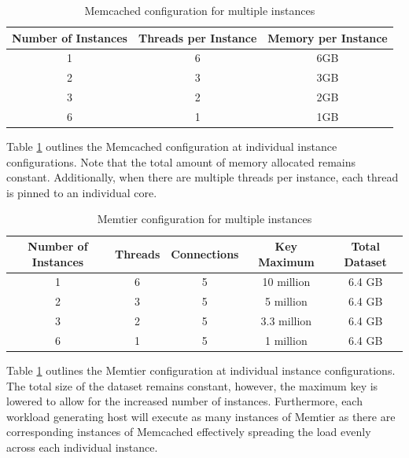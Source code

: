 \begin{table}[h!]
\centering
\begin{tabular}{| c c c |}
 \hline
 Number of Instances & Threads per Instance & Memory per Instance \\ [0.5ex]
 \hline\hline

 1 & 6 & 6GB \\
 2 & 3 & 3GB \\
 3 & 2 & 2GB \\
 6 & 1 & 1GB \\

 \hline

\end{tabular}
\caption{Memcached configuration for multiple instances}
\label{tab:m_instances_memcached_conf}
\end{table}

Table \ref{tab:m_instances_memcached_conf} outlines the Memcached configuration at individual instance configurations. Note that the total amount of memory allocated remains constant. Additionally, when there are multiple threads per instance, each thread is pinned to an individual core.

\begin{table}[h!]
\centering
\begin{tabular}{| c c c c c|}
 \hline
 Number of Instances & Threads & Connections & Key Maximum & Total Dataset\\ [0.5ex]
 \hline\hline

 1 & 6 & 5 & 10 million & 6.4 GB \\
 2 & 3 & 5 & 5 million & 6.4 GB \\
 3 & 2 & 5 & 3.3 million & 6.4 GB \\
 6 & 1 & 5 & 1 million & 6.4 GB \\

 \hline

\end{tabular}
\caption{Memtier configuration for multiple instances}
\label{tab:m_instances_memtier_conf}
\end{table}

Table \ref{tab:m_instances_memcached_conf} outlines the Memtier configuration at individual instance configurations. The total size of the dataset remains constant, however, the maximum key is lowered to allow for the increased number of instances. Furthermore, each workload generating host will execute as many instances of Memtier as there are corresponding instances of Memcached effectively spreading the load evenly across each individual instance.

